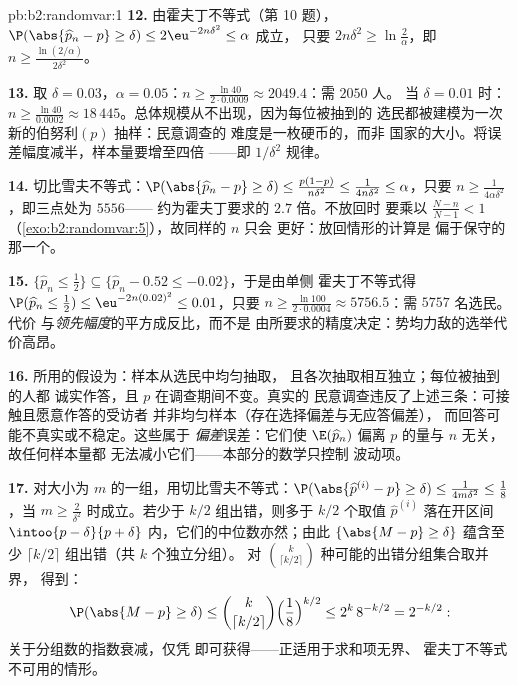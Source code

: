 \begin{solution}{pb:b2:randomvar:1}
\textbf{12.} 由霍夫丁不等式（第 10 题），$\P(\abs{\widehat
p_n - p} \geq \delta) \leq 2\eu^{-2n\delta^2} \leq \alpha$ 成立，
只要 $2n\delta^2 \geq \ln\frac2\alpha$，即 $n \geq
\frac{\ln(2/\alpha)}{2\delta^2}$。

\textbf{13.} 取 $\delta = 0.03$，$\alpha = 0.05$：$n \geq
\frac{\ln 40}{2\cdot0.0009} \approx 2049.4$：需 $2050$ 人。
当 $\delta = 0.01$ 时：$n \geq \frac{\ln40}{0.0002} \approx
18\,445$。总体规模从不出现，因为每位被抽到的
选民都被建模为一次新的伯努利$(p)$ 抽样：民意调查的
难度是一枚硬币的，而非
国家的大小。将误差幅度减半，样本量要增至四倍
——即 $1/\delta^2$ 规律。

\textbf{14.} 切比雪夫不等式：$\P(\abs{\widehat p_n - p} \geq
\delta) \leq \frac{p(1-p)}{n\delta^2} \leq
\frac1{4n\delta^2} \leq \alpha$，只要 $n \geq
\frac1{4\alpha\delta^2}$，即三点处为 $5556$——
约为霍夫丁要求的 $2.7$ 倍。不放回时
要乘以 $\frac{N -
n}{N-1} < 1$（\cref{exo:b2:randomvar:5}），故同样的 $n$ 只会
更好：放回情形的计算是
偏于保守的那一个。

\textbf{15.} $\{\widehat p_n \leq \frac12\} \subseteq
\{\widehat p_n - 0.52 \leq -0.02\}$，于是由单侧
霍夫丁不等式得 $\P(\widehat p_n \leq \tfrac12) \leq
\eu^{-2n(0.02)^2} \leq 0.01$，只要 $n \geq \frac{\ln
100}{2\cdot0.0004} \approx 5756.5$：需 $5757$ 名选民。代价
与\emph{领先幅度}的平方成反比，而不是
由所要求的精度决定：势均力敌的选举代价高昂。

\textbf{16.} 所用的假设为：样本从选民中均匀抽取，
且各次抽取相互独立；每位被抽到的人都
诚实作答，且 $p$ 在调查期间不变。真实的
民意调查违反了上述三条：可接触且愿意作答的受访者
并非均匀样本（存在选择偏差与无应答偏差），
而回答可能不真实或不稳定。这些属于
\emph{偏差}误差：它们使 $\E(\widehat p_n)$ 偏离
$p$ 的量与 $n$ 无关，故任何样本量都
无法减小它们——本部分的数学只控制
波动项。

\textbf{17.} 对大小为 $m$ 的一组，用切比雪夫不等式：$\P(\abs{
\widehat p^{(i)} - p} \geq \delta) \leq \frac{1}{4m\delta^2}
\leq \frac18$，当 $m \geq \frac2{\delta^2}$ 时成立。若少于
$k/2$ 组出错，则多于 $k/2$ 个取值
$\widehat p^{(i)}$ 落在开区间 $\intoo{p -
\delta}{p + \delta}$ 内，它们的中位数亦然；由此
$\{\abs{M - p} \geq \delta\}$ 蕴含至少 $\lceil
k/2\rceil$ 组出错（共 $k$ 个独立分组）。
对 $\binom k{\lceil k/2\rceil}$ 种可能的出错分组集合取并界，
得到：
\[
\P(\abs{M - p} \geq \delta)
\leq \binom{k}{\lceil k/2\rceil}
\Bigl(\frac18\Bigr)^{k/2}
\leq 2^k\,8^{-k/2} = 2^{-k/2} :
\]
关于分组数的指数衰减，仅凭
即可获得——正适用于求和项无界、
霍夫丁不等式不可用的情形。


\end{solution}
